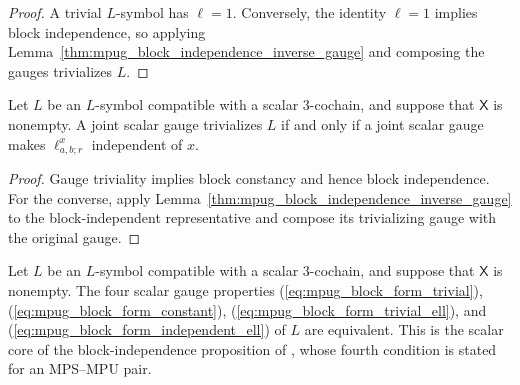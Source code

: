 \begin{proof}\leanok
    A trivial $L$-symbol has $\ell=1$. Conversely, the identity $\ell=1$
    implies block independence, so applying
    Lemma~\ref{thm:mpug_block_independence_inverse_gauge} and composing the
    gauges trivializes $L$.
\end{proof}

\begin{lemma}
    \label{thm:mpug_trivial_iff_block_independent}
    \leanok
    Let $L$ be an $L$-symbol compatible with a scalar $3$-cochain,
    and suppose that $\mathsf X$ is nonempty. A joint scalar gauge trivializes
    $L$ if and only if a joint scalar gauge makes $\ell^x_{a,b;r}$ independent
    of $x$.
\end{lemma}

\begin{proof}\leanok
    Gauge triviality implies block constancy and hence block independence.
    For the converse, apply
    Lemma~\ref{thm:mpug_block_independence_inverse_gauge} to the
    block-independent representative and compose its trivializing gauge with
    the original gauge.
\end{proof}

\begin{lemma}
    \label{thm:mpug_block_independence_four_forms}
    \leanok
    Let $L$ be an $L$-symbol compatible with a scalar $3$-cochain,
    and suppose that $\mathsf X$ is nonempty. The four scalar gauge
    properties (\ref{eq:mpug_block_form_trivial}),
    (\ref{eq:mpug_block_form_constant}),
    (\ref{eq:mpug_block_form_trivial_ell}), and
    (\ref{eq:mpug_block_form_independent_ell}) of $L$ are equivalent. This is
    the scalar core of the block-independence proposition of
    \cite{FrancoRubio2025MPUGauging}, whose fourth condition is stated for an
    MPS--MPU pair.
\end{lemma}

